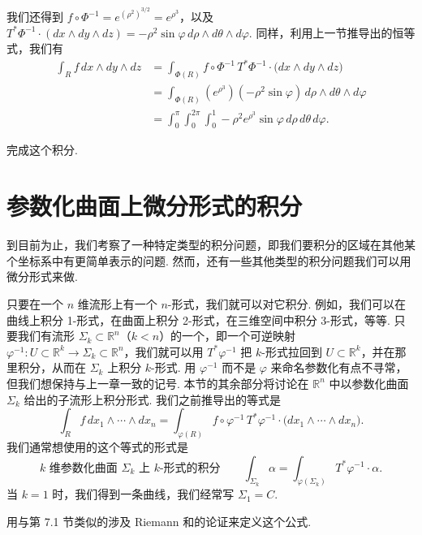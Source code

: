 我们还得到 $f\circ\Phi^{-1}=e^{(\rho^2)^{3/2}}=e^{\rho^3}$，以及 $T^*\Phi^{-1}\cdot(dx\wedge dy\wedge dz)=-\rho^2\sin\varphi\,d\rho\wedge d\theta\wedge d\varphi$. 同样，利用上一节推导出的恒等式，我们有
\begin{align*}
\int_R f\,dx\wedge dy\wedge dz
&=\int_{\Phi(R)}f\circ\Phi^{-1}\,T^*\Phi^{-1}\cdot\bigl(dx\wedge dy\wedge dz\bigr)\\
&=\int_{\Phi(R)}(e^{\rho^3})(-\rho^2\sin\varphi)\,d\rho\wedge d\theta\wedge d\varphi\\
&=\int_0^{\pi}\int_0^{2\pi}\int_0^1-\rho^2e^{\rho^3}\sin\varphi\,d\rho\,d\theta\,d\varphi.
\end{align*}

\begin{question}\label{q:7-11}
完成这个积分.
\end{question}

\section{参数化曲面上微分形式的积分}

到目前为止，我们考察了一种特定类型的积分问题，即我们要积分的区域在其他某个坐标系中有更简单表示的问题. 然而，还有一些其他类型的积分问题我们可以用微分形式来做.

只要在一个 $n$ 维流形上有一个 $n$-形式，我们就可以对它积分. 例如，我们可以在曲线上积分 1-形式，在曲面上积分 2-形式，在三维空间中积分 3-形式，等等. 只要我们有流形 $\Sigma_k\subset\mathbb{R}^n$（$k<n$）的一个，即一个可逆映射 $\varphi^{-1}:U\subset\mathbb{R}^k\to\Sigma_k\subset\mathbb{R}^n$，我们就可以用 $T^*\varphi^{-1}$ 把 $k$-形式拉回到 $U\subset\mathbb{R}^k$，并在那里积分，从而在 $\Sigma_k$ 上积分 $k$-形式. 用 $\varphi^{-1}$ 而不是 $\varphi$ 来命名参数化有点不寻常，但我们想保持与上一章一致的记号. 本节的其余部分将讨论在 $\mathbb{R}^n$ 中以参数化曲面 $\Sigma_k$ 给出的子流形上积分形式. 我们之前推导出的等式是
\[
\int_R f\,dx_1\wedge\cdots\wedge dx_n=\int_{\varphi(R)}f\circ\varphi^{-1}\,T^*\varphi^{-1}\cdot\bigl(dx_1\wedge\cdots\wedge dx_n\bigr).
\]
我们通常想使用的这个等式的形式是
\[
\text{$k$ 维参数化曲面 $\Sigma_k$ 上 $k$-形式的积分}\qquad\int_{\Sigma_k}\alpha=\int_{\varphi(\Sigma_k)}T^*\varphi^{-1}\cdot\alpha.
\]
当 $k=1$ 时，我们得到一条曲线，我们经常写 $\Sigma_1=C$.

\begin{question}\label{q:7-12}
用与第 7.1 节类似的涉及 Riemann 和的论证来定义这个公式.
\end{question}

